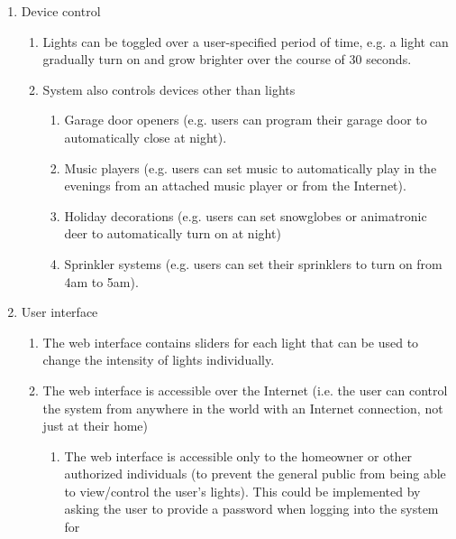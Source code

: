 \documentclass[12pt]{article}
\begin{document}
\begin{enumerate}[resume]
    \item Device control
        \begin{enumerate}
            \item Lights can be toggled over a user-specified period of time,
                e.g. a light can gradually turn on and grow brighter over the
                course of 30 seconds.
            \item System also controls devices other than lights
                \begin{enumerate}
                    \item Garage door openers (e.g. users can program their
                        garage door to automatically close at night).
                    \item Music players (e.g. users can set music to
                        automatically play in the evenings from an attached
                        music player or from the Internet).
                    \item Holiday decorations (e.g. users can set snowglobes or
                        animatronic deer to automatically turn on at night)
                    \item Sprinkler systems (e.g. users can set their
                        sprinklers to turn on from 4am to 5am).
                \end{enumerate}
        \end{enumerate}
    \item User interface
        \begin{enumerate}
            \item The web interface contains sliders for each light that can be
                used to change the intensity of lights individually.
            \item The web interface is accessible over the Internet (i.e. the
                user can control the system from anywhere in the world with an
                Internet connection, not just at their home)
                \begin{enumerate}
                    \item The web interface is accessible only to the homeowner
                        or other authorized individuals (to prevent the general
                        public from being able to view/control the user's
                        lights).  This could be implemented by asking the user
                        to provide a password when logging into the system for

\end{enumerate}
\end{enumerate}
\end{enumerate}
\end{document}
